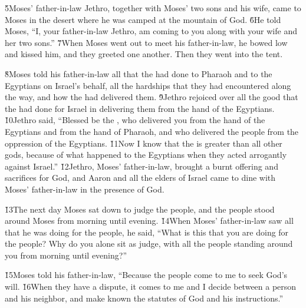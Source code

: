 \v{5}Moses' father-in-law Jethro, together with Moses' two sons and his wife, came to Moses in the desert where he was camped at the mountain of God. \v{6}He told Moses, ``I, your father-in-law Jethro, am coming to you along with your wife and her two sons.'' \v{7}When Moses went out to meet his father-in-law, he bowed low and kissed him, and they greeted one another. Then they went into the tent.

\v{8}Moses told his father-in-law all that the  had done to Pharaoh and to the Egyptians on Israel's behalf, all the hardships that they had encountered along the way, and how the  had delivered them. \v{9}Jethro rejoiced over all the good that the  had done for Israel in delivering them from the hand of the Egyptians. \v{10}Jethro said, ``Blessed be the , who delivered you from the hand of the Egyptians and from the hand of Pharaoh, and who delivered the people from the oppression of the Egyptians. \v{11}Now I know that the  is greater than all other gods, because of what happened to the Egyptians when they acted arrogantly against Israel.'' \v{12}Jethro, Moses' father-in-law, brought a burnt offering and sacrifices for God, and Aaron and all the elders of Israel came to dine with Moses' father-in-law in the presence of God.

\v{13}The next day Moses sat down to judge the people, and the people stood around Moses from morning until evening. \v{14}When Moses' father-in-law saw all that he was doing for the people, he said, ``What is this that you are doing for the people? Why do you alone sit as judge, with all the people standing around you from morning until evening?''

\v{15}Moses told his father-in-law, ``Because the people come to me to seek God's will. \v{16}When they have a dispute, it comes to me and I decide between a person and his neighbor, and make known the statutes of God and his instructions.''

